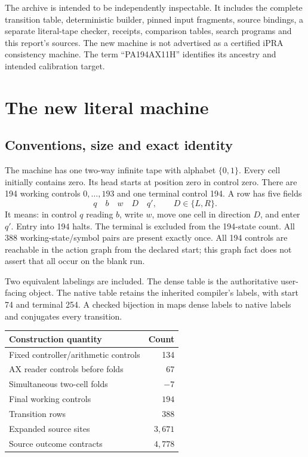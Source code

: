 \documentclass[11pt,a4paper]{article}
\begin{document}
The archive is intended to be independently inspectable. It includes the
complete transition table, deterministic builder, pinned input fragments,
source bindings, a separate literal-tape checker, receipts, comparison
tables, search programs and this report's sources. The new machine is not
advertised as a certified iPRA consistency machine. The term ``PA194AX11H''
identifies its ancestry and intended calibration target.



\section{The new literal machine}
\label{sec:machine}

\subsection{Conventions, size and exact identity}

The machine has one two-way infinite tape with alphabet $\{0,1\}$.
Every cell initially contains zero. Its head starts at position zero in
control zero. There are 194 working controls $0,\ldots,193$ and one terminal
control 194. A row has five fields
\[
 q\quad b\quad w\quad D\quad q',
 \qquad D\in\{L,R\}.
\]
It means: in control $q$ reading $b$, write $w$, move one cell in direction
$D$, and enter $q'$. Entry into 194 halts. The terminal is excluded from
the 194-state count. All 388 working-state/symbol pairs are present exactly
once. All 194 controls are reachable in the action graph from the declared
start; this graph fact does not assert that all occur on the blank run.

Two equivalent labelings are included. The dense table is the authoritative
user-facing object. The native table retains the inherited compiler's
labels, with start 74 and terminal 254. A checked bijection in
 maps dense labels to native labels and conjugates
every transition.

\begin{center}
\begin{tabular}{lr}
\toprule
Construction quantity & Count\\
\midrule
Fixed controller/arithmetic controls & 134\\
AX reader controls before folds & 67\\
Simultaneous two-cell folds & $-7$\\
Final working controls & $194$\\
Transition rows & $388$\\
Expanded source sites & $3,671$\\
Source outcome contracts & $4,778$\\
\bottomrule
\end{tabular}
\end{center}
\end{document}
